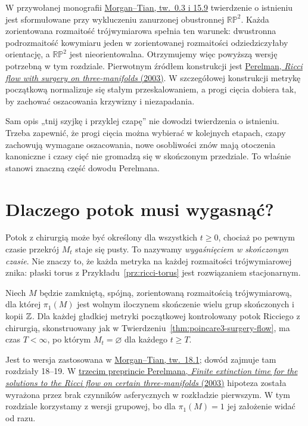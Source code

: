 W przywołanej monografii
\href{https://www.claymath.org/library/monographs/cmim03.pdf}
{Morgan--Tian, tw.\ 0.3 i 15.9}
twierdzenie o istnieniu jest sformułowane
przy wykluczeniu zanurzonej obustronnej
$\mathbb{RP}^2$. Każda zorientowana
rozmaitość trójwymiarowa spełnia ten warunek:
dwustronna podrozmaitość kowymiaru jeden
w zorientowanej rozmaitości odziedziczyłaby
orientację, a $\mathbb{RP}^2$ jest
nieorientowalna. Otrzymujemy więc powyższą
wersję potrzebną w tym rozdziale.
Pierwotnym źródłem konstrukcji jest
\href{https://arxiv.org/pdf/math/0303109}
{Perelman, \emph{Ricci flow with surgery on
three-manifolds} (2003)}.
W szczegółowej konstrukcji metrykę początkową
normalizuje się stałym przeskalowaniem,
a progi cięcia dobiera tak, by zachować
oszacowania krzywizny i niezapadania.

Sam opis „tnij szyjkę i przyklej czapę”
nie dowodzi twierdzenia o istnieniu.
Trzeba zapewnić, że progi cięcia można
wybierać w kolejnych etapach, czapy
zachowują wymagane oszacowania,
nowe osobliwości znów mają otoczenia
kanoniczne i czasy cięć nie gromadzą się
w skończonym przedziale. To właśnie
stanowi znaczną część dowodu Perelmana.

\section{Dlaczego potok musi wygasnąć?}
\label{sec:poincare3-wygasanie}

Potok z chirurgią może być określony dla
wszystkich $t\geq0$, chociaż po pewnym
czasie przekrój $M_t$ staje się pusty.
To nazywamy \emph{wygaśnięciem w skończonym
czasie}. Nie znaczy to, że każda metryka
na każdej rozmaitości trójwymiarowej znika:
płaski torus z Przykładu~\ref{prz:ricci-torus}
jest rozwiązaniem stacjonarnym.

\begin{twierdzenie}
\label{thm:poincare3-extinction}
Niech $M$ będzie zamkniętą, spójną,
zorientowaną rozmaitością trójwymiarową, dla której
$\pi_1(M)$ jest wolnym iloczynem skończenie
wielu grup skończonych i kopii $\mathbb{Z}$.
Dla każdej gładkiej metryki początkowej
kontrolowany potok Ricciego z chirurgią,
skonstruowany jak w
Twierdzeniu~\ref{thm:poincare3-surgery-flow},
ma czas $T<\infty$, po którym $M_t=\varnothing$
dla każdego $t\geq T$.
\end{twierdzenie}

Jest to wersja zastosowana w
\href{https://www.claymath.org/library/monographs/cmim03.pdf}
{Morgan--Tian, tw.\ 18.1}; dowód zajmuje
tam rozdziały 18--19. W
\href{https://arxiv.org/pdf/math/0307245}
{trzecim preprincie Perelmana,
\emph{Finite extinction time for the solutions
to the Ricci flow on certain three-manifolds}
(2003)} hipoteza została wyrażona przez brak
czynników asferycznych w rozkładzie pierwszym.
W tym rozdziale korzystamy z wersji grupowej,
bo dla $\pi_1(M)=1$ jej założenie widać od razu.

